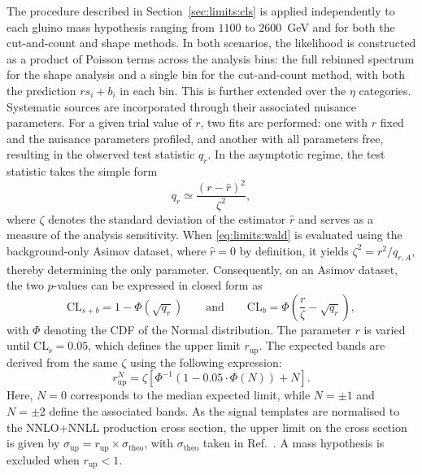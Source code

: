 The procedure described in Section~\ref{sec:limits:cls} is applied independently to each gluino mass hypothesis ranging from $1100$ to $2600$~GeV and for both the cut-and-count and shape methods. In both scenarios, the likelihood is constructed as a product of Poisson terms across the analysis bins: the full rebinned spectrum for the shape analysis and a single bin for the cut-and-count method, with both the prediction $r s_i + b_i$ in each bin. This is further extended over the $\eta$ categories. Systematic sources are incorporated through their associated nuisance parameters. For a given trial value of $r$, two fits are performed: one with $r$ fixed and the nuisance parameters profiled, and another with all parameters free, resulting in the observed test statistic $q_r$. In the asymptotic regime, the test statistic takes the simple form
\begin{equation}
    q_r \simeq \frac{\left(r - \hat{r}\right)^2}{\zeta^2},
    \label{eq:limits:wald}
\end{equation}
where $\zeta$ denotes the standard deviation of the estimator $\hat{r}$ and serves as a measure of the analysis sensitivity. When \cref{eq:limits:wald} is evaluated using the background-only Asimov dataset, where $\hat{r} = 0$ by definition, it yields $\zeta^2 = r^2/q_{r,A}$, thereby determining the only parameter. Consequently, on an Asimov dataset, the two $p$-values can be expressed in closed form as
\begin{equation}
    \text{CL}_{s+b} = 1 - \Phi\!\left(\sqrt{q_r}\right)
    \qquad \mathrm{and} \qquad
    \text{CL}_{b} = \Phi\!\left(\frac{r}{\zeta} - \sqrt{q_r}\right),
    \label{eq:limits:pvalues}
\end{equation}
with $\Phi$ denoting the CDF of the Normal distribution. The parameter $r$ is varied until $\text{CL}_\text{s} = 0.05$, which defines the upper limit $r_\text{up}$. The expected bands are derived from the same $\zeta$ using the following expression:
\begin{equation}
    r_\text{up}^{N} = \zeta \left[ \Phi^{-1}\!\left(1 - 0.05\cdot\Phi(N)\right) + N \right].
    \label{eq:limits:bands}
\end{equation}
Here, $N = 0$ corresponds to the median expected limit, while $N = \pm1$ and $N = \pm2$ define the associated bands. As the signal templates are normalised to the NNLO+NNLL production cross section, the upper limit on the cross section is given by $\sigma_\text{up} = r_\text{up} \times \sigma_\text{theo}$, with $\sigma_\text{theo}$ taken in Ref.~\cite{10.21468/SciPostPhysCore.7.4.072}. A mass hypothesis is excluded when $r_\text{up} < 1$.


